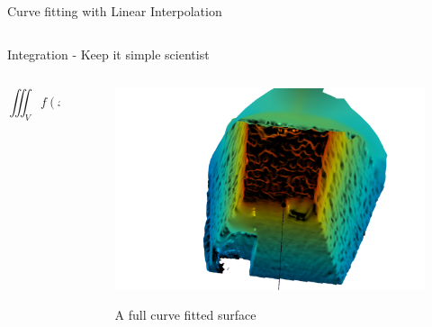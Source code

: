 \documentclass{beamer}
\begin{document}
\begin{frame}{Curve fitting with Linear Interpolation}
\begin{columns}
\begin{column}{0.6\textwidth}
\begin{center}
		\end{center}
	\end{column}
\end{columns}

\end{frame}


\begin{frame}{Integration -  Keep it simple scientist}
\begin{columns}
\begin{column}{0.5\textwidth}  %
	\begin{center}
	\begin{equation}
	\iiint_V f(x,y,z) \,dx\,dy\,dz 
	\end{equation}
	
		
	
	\end{center}
\end{column}
\begin{column}{0.5\textwidth}  %
	\begin{center}
\begin{figure}
	\includegraphics[width=0.75\linewidth]{Figures/meshlab}
	\label{meshlab2}
	\caption{A full curve fitted surface}
\end{figure}


\end{center}
\end{column}
\end{columns}
\end{frame}
\end{document}
